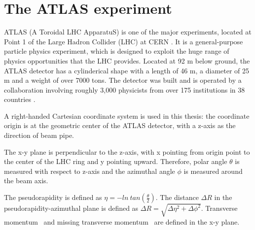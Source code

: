 \chapter{The ATLAS experiment}

\label{ch:atlas}
\par ATLAS (A Toroidal LHC ApparatuS) is one of the major experiments, located at Point 1 of the Large Hadron Collider (LHC) at CERN \cite{Aad:2008zzm}. It is a general-purpose particle physics experiment, which is designed to exploit the huge range of physics opportunities that the LHC provides. Located at 92 m below ground, the ATLAS detector has a cylinderical shape with a length of 46 m, a diameter of 25 m and a weight of over 7000 tons.
 The detector was built and is operated by a collaboration involving roughly 3,000 physicists from over 175 institutions in 38 countries \cite{fact}.
\par A right-handed Cartesian coordinate system is used in this thesis: the coordinate origin is at the geometric center of the ATLAS detector, with a z-axis as the direction of beam pipe.
\par The x-y plane is perpendicular to the z-axis, with x pointing from origin point to the center of the LHC ring and y pointing upward. Therefore, polar angle $\theta$ is measured with respect to z-axis and the azimuthal angle $\phi$ is measured around the beam axis. 
\par The pseudorapidity is defined as $\eta = -ln~tan(\frac{\theta}{2})$. The distance $\Delta R$ in the pseudorapidity-azimuthal plane is defined as 
$\Delta R = \sqrt{\Delta\eta^2 + \Delta\phi^2}$. Transverse momentum \pt~and missing transverse momentum \met~are defined in the x-y plane.

